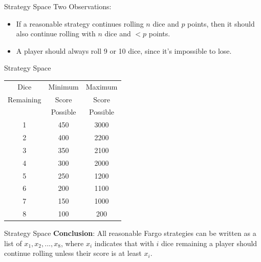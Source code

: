 \documentclass{beamer}
\begin{document}
  \begin{frame}{Strategy Space}
  Two Observations:
  	\begin{itemize}
    \item If a reasonable strategy continues rolling $n$ dice and $p$ points, then it should also continue rolling with $n$ dice and $<p$ points. 
    \item A player should always roll 9 or 10 dice, since it's impossible to lose.
    \end{itemize}
  \end{frame}

  \begin{frame}{Strategy Space}
	\begin{table}[]
	\centering
	\begin{tabular}{|c|c|c|}
	\hline
Dice      & Minimum    & Maximum   \\
Remaining & Score      & Score     \\ 
          & Possible   & Possible  \\ \hline
1         & 450        & 3000      \\ \hline
2         & 400        & 2200      \\ \hline
3         & 350        & 2100      \\ \hline
4         & 300        & 2000      \\ \hline
5         & 250        & 1200      \\ \hline
6         & 200        & 1100      \\ \hline
7         & 150        & 1000      \\ \hline
8         & 100        & 200       \\ \hline
	\end{tabular}
  \end{table}
  \end{frame}

  \begin{frame}{Strategy Space}
  \textbf{Conclusion}: All reasonable Fargo strategies can be written as a list of $x_1, x_2, ..., x_8$, where $x_i$ indicates that with $i$ dice remaining a player should continue rolling unless their score is at least $x_i$.
  \end{frame}
  
\end{document}
